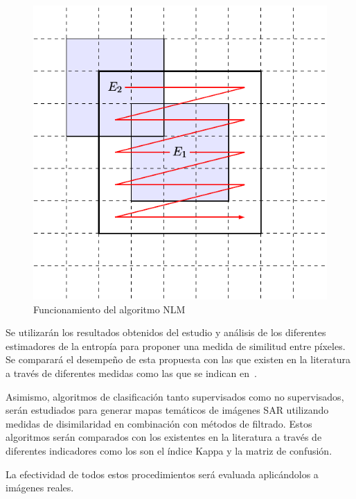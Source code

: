 \documentclass[11pt]{article}
\begin{document}
\begin{figure}[hbt]
	\label{NLM}
	\centering
	\includegraphics[scale=0.6]{../../Figures/Proyectos/UNGS2020/filtros.pdf}
	\caption{Funcionamiento del algoritmo NLM}
\end{figure}

Se utilizarán los resultados obtenidos del estudio y análisis de los diferentes estimadores de la entropía para proponer una medida de similitud entre píxeles. Se comparará el desempeño de esta propuesta con las que existen en la literatura a través de diferentes medidas como las que se indican en~\cite{Frery2019}.

Asimismo, algoritmos de clasificación tanto supervisados como no supervisados, serán estudiados para generar mapas temáticos de imágenes SAR utilizando medidas de disimilaridad en combinación con métodos de filtrado. Estos algoritmos serán comparados con los existentes en la literatura a través de diferentes indicadores como los son el índice Kappa y la matriz de confusión.

La efectividad de todos estos procedimientos será evaluada aplicándolos a imágenes reales.
\end{document}
